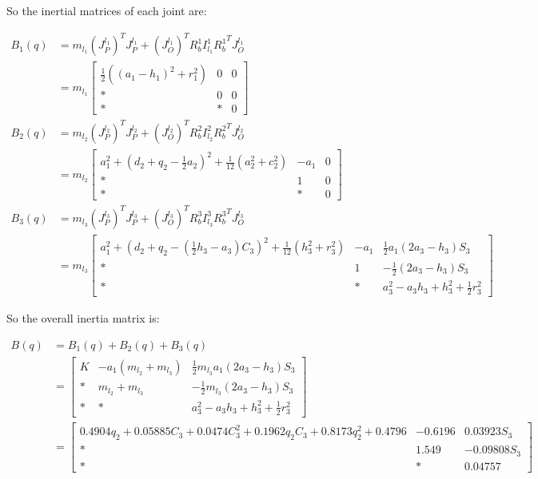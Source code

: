 So the inertial matrices of each joint are:

\begin{align*}
B_1(q)&=m_{l_1}(J_P^{l_1})^TJ_P^{l_1}+(J_O^{l_1})^TR_b^1I_{l_1}^1{R_b^1}^TJ_O^{l_1}\\
&=m_{l_1}\begin{bmatrix}
\frac{1}{2}((a_1-h_1)^2+r_1^2)& 0& 0\\ *& 0& 0\\ *& *& 0
 \end{bmatrix}\\
B_2(q)&=m_{l_2}(J_P^{l_2})^TJ_P^{l_2}+(J_O^{l_2})^TR_b^2I_{l_2}^2{R_b^2}^TJ_O^{l_2}\\
&=m_{l_2}\begin{bmatrix}
a_1^2+\left(d_2+q_2-\frac{1}{2}a_2\right)^2+\frac{1}{12}\left(a_2^2+c_2^2\right)&-a_1&0\\
*& 1 & 0\\
*&*&0
\end{bmatrix}\\
B_3(q)&=m_{l_3}(J_P^{l_3})^TJ_P^{l_3}+(J_O^{l_3})^TR_b^3I_{l_3}^3{R_b^3}^TJ_O^{l_3}\\
&=m_{l_3}\begin{bmatrix}
a_1^2 + \left(d_2+q_2-\left(\frac{1}{2}h_3-a_3\right)C_3\right)^2+\frac{1}{12}(h_3^2+r_3^2) & -a_1 & \frac{1}{2}a_1(2a_3-h_3)S_3\\
* & 1 & -\frac{1}{2}(2a_3-h_3)S_3\\
* & * & a_3^2-a_3h_3+h_3^2+\frac{1}{2}r_3^2
\end{bmatrix}
\end{align*} 
     
\newpage

So the overall inertia matrix is:

\begin{align*}
B(q) &= B_1(q)+B_2(q)+B_3(q)\\&= \begin{bmatrix}
K& -a_1( m_{l_2} + m_{l_3}) & \frac{1}{2}m_{l_3}a_1(2a_3-h_3)S_3\\
* & m_{l_2} + m_{l_3} & -\frac{1}{2}m_{l_3}(2a_3-h_3)S_3\\
* & * & a_3^2-a_3h_3+h_3^2+\frac{1}{2}r_3^2
\end{bmatrix}\\&=\begin{bmatrix}
0.4904q_2 + 0.05885C_3 + 0.0474C_3^2 + 0.1962q_2C_3 + 0.8173q_2^2 + 0.4796&          -0.6196&  0.03923S_3\\
 * &          1.549 & -0.09808S_3\\ *& * &0.04757
\end{bmatrix}
\end{align*}

